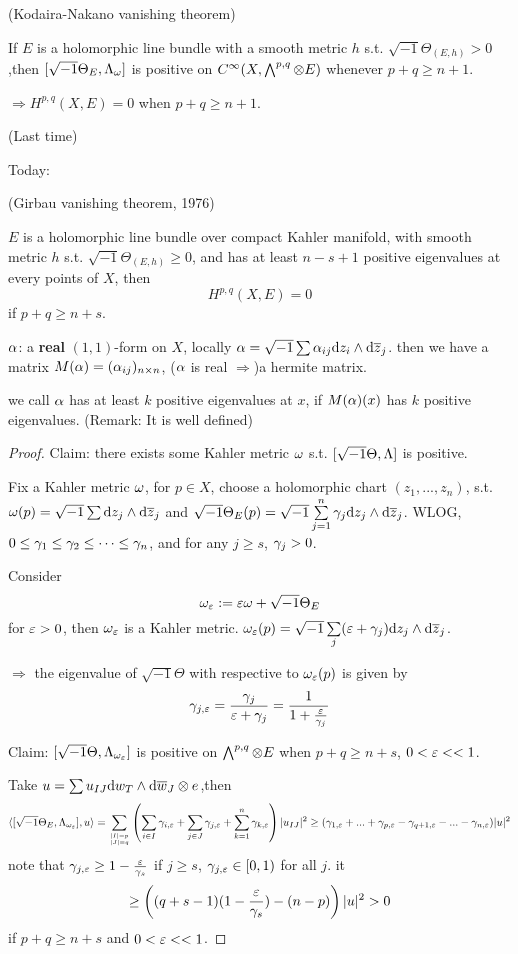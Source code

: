 \begin{thm}(Kodaira-Nakano vanishing theorem)

If $E$ is a holomorphic line bundle with a smooth metric $h$ s.t.
$\sqrt{-1}\Theta_{(E,h)}>0$,then
$[\sqrt{-1}\Theta_E,\Lambda_\omega]$ is positive on
$C^\infty(X,\bigwedge\nolimits^{p,q}\otimes E)$ whenever $p+q\geq n+1$.

$\Rightarrow H^{p,q}(X,E)=0$ when $p+q\geq n+1$.
\end{thm}
(Last time)

Today:
\begin{thm}(Girbau vanishing theorem, 1976)

$E$ is a holomorphic line bundle over compact Kahler manifold,
with smooth metric $h$ s.t. $\sqrt{-1}\Theta_{(E,h)}\geq 0$,
and has at least $n-s+1$ positive eigenvalues at every points of $X$, then
$$H^{p,q}(X,E)=0$$
if $p+q\geq n+s$.
\end{thm}

$\alpha$: a \textbf{real} $(1,1)$-form on $X$,
locally $\alpha=\sqrt{-1}\sum\alpha_{ij}\mathrm{d} z_i\wedge\mathrm{d}\overline{z}_j$.
then we have a matrix $M(\alpha)=(\alpha_{ij})_{n\times n}$,
($\alpha$ is real $\Rightarrow$)a hermite matrix.

we call $\alpha$ has at least $k$ positive eigenvalues at $x$,
if $M(\alpha)(x)$ has $k$ positive eigenvalues.
(Remark: It is well defined)

\begin{proof}
Claim: there exists some Kahler metric $\omega$
s.t. $[\sqrt{-1}\Theta,\Lambda]$ is positive.

Fix a Kahler metric $\omega$,
for $p\in X$, choose a holomorphic chart $(z_1,...,z_n)$,
s.t. $\omega(p)=\sqrt{-1}\sum\mathrm{d} z_j\wedge\mathrm{d}\overline{z}_j$ and
$\sqrt{-1}\Theta_E(p)=\sqrt{-1}\sum\limits_{j=1}^{n}\gamma_j\mathrm{d} z_j\wedge\mathrm{d}\overline{z}_j$.
WLOG, $0\leq\gamma_1\leq\gamma_2\leq\cdots\leq\gamma_n$,
and for any $j\geq s$, $\gamma_j>0$.

Consider
$$\omega_\varepsilon:=\varepsilon\omega+\sqrt{-1}\Theta_E$$
for $\varepsilon>0$, then $\omega_\varepsilon$ is a Kahler metric.
$\omega_\varepsilon(p)=\sqrt{-1}\sum\limits_{j}(\varepsilon+\gamma_j)\mathrm{d} z_j\wedge\mathrm{d}\overline{z}_j$.

$\Rightarrow$ the eigenvalue of $\sqrt{-1}\Theta$ with respective to
$\omega_\varepsilon(p)$ is given by
$$\gamma_{j,\varepsilon}=\frac{\gamma_j}{\varepsilon+\gamma_j}=
\frac{1}{1+\frac{\varepsilon}{\gamma_j}}$$

Claim: $[\sqrt{-1}\Theta,\Lambda_{\omega_\varepsilon}]$ is positive on
$\bigwedge\nolimits^{p,q}\otimes E$ when $p+q\geq n+s$, $0<\varepsilon<<1$.

Take $u=\sum\limits u_{IJ}\mathrm{d} w_T\wedge\mathrm{d}\overline{w}_J\otimes e$,then
$$
  \langle [\sqrt{-1}\Theta_E,\Lambda_{\omega_\varepsilon}],u \rangle
=
  \sum_{|I|=p\atop|J|=q}
    \left(
      \sum_{i\in I}
        \gamma_{i,\varepsilon}
     +\sum_{j\in J}
       \gamma_{j,\varepsilon}
     +\sum_{k=1}^{n}
       \gamma_{k,\varepsilon}
    \right)
    |u_{IJ}|^2
\geq
  (\gamma_{1,\varepsilon}+...+\gamma_{p,\varepsilon}-\gamma_{q+1,\varepsilon}-...-\gamma_{n,\varepsilon})
  |u|^2
$$
note that $\gamma_{j,\varepsilon}\geq 1-\frac{\varepsilon}{\gamma_s}$
if $j\geq s$, $\gamma_{j,\varepsilon}\in[0,1)$ for all $j$. it
$$
\geq
  \left(
    (q+s-1)(1-\frac{\varepsilon}{\gamma_s})
   -(n-p)
  \right)
  |u|^2
>0
$$
if $p+q\geq n+s$ and $0<\varepsilon<<1$.
\end{proof}


